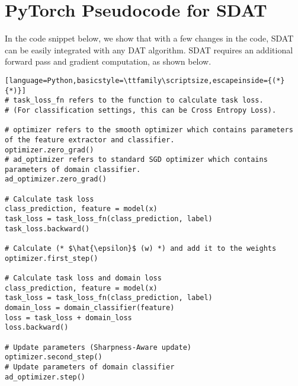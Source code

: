 \documentclass[table,dvipsnames]{article}
\theoremstyle{plain}
\theoremstyle{definition}
\theoremstyle{remark}
\begin{document}
\section{PyTorch Pseudocode for SDAT}
In the code snippet below, we show that with a few changes in the code, SDAT can be easily integrated with any DAT algorithm. SDAT requires an additional forward pass and gradient computation, as shown below.
\label{app:pytorchcode}
\begin{lstlisting}[language=Python,basicstyle=\ttfamily\scriptsize,escapeinside={(*}{*)}]
# task_loss_fn refers to the function to calculate task loss. 
# (For classification settings, this can be Cross Entropy Loss).

# optimizer refers to the smooth optimizer which contains parameters of the feature extractor and classifier.
optimizer.zero_grad()
# ad_optimizer refers to standard SGD optimizer which contains parameters of domain classifier.
ad_optimizer.zero_grad()

# Calculate task loss
class_prediction, feature = model(x)
task_loss = task_loss_fn(class_prediction, label)
task_loss.backward()

# Calculate (* $\hat{\epsilon}$ (w) *) and add it to the weights
optimizer.first_step()

# Calculate task loss and domain loss
class_prediction, feature = model(x)
task_loss = task_loss_fn(class_prediction, label)
domain_loss = domain_classifier(feature)
loss = task_loss + domain_loss
loss.backward()

# Update parameters (Sharpness-Aware update)
optimizer.second_step()
# Update parameters of domain classifier
ad_optimizer.step()
\end{lstlisting}
\end{document}
